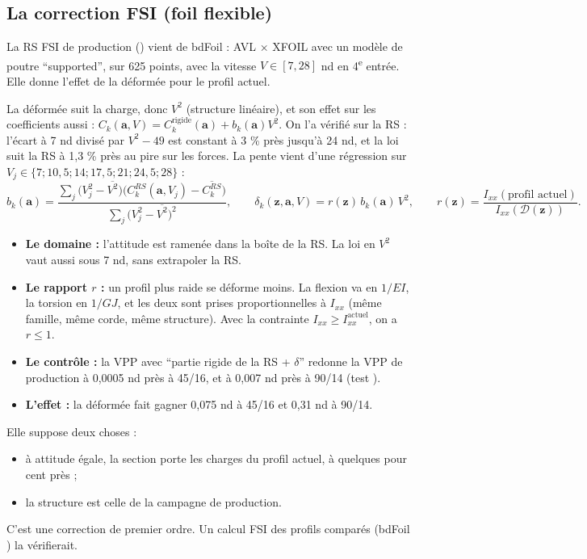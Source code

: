 \documentclass[10pt,a4paper]{article}
\newcommand{\vz}{\bm{z}}
\newcommand{\va}{\bm{a}}
\begin{document}
\subsection{La correction FSI (foil flexible)}
\label{sec:fsi}
La RS FSI de production () vient de bdFoil
 : AVL × XFOIL avec un modèle de poutre \enquote{supported}, sur 625 points, avec la
vitesse $V\in[7,28]$ nd en 4\textsuperscript{e} entrée. Elle donne l'effet de la déformée pour le profil
actuel.

La déformée suit la charge, donc $V^2$ (structure linéaire), et son effet sur les coefficients aussi :
$C_k(\va,V)=C_k^{\text{rigide}}(\va)+b_k(\va)V^2$. On l'a vérifié sur la RS : l'écart à 7 nd divisé par
$V^2-49$ est constant à 3 \% près jusqu'à 24 nd, et la loi suit la RS à 1,3 \% près au pire sur les forces.
La pente vient d'une régression sur $V_j\in\{7;10{,}5;14;17{,}5;21;24{,}5;28\}$ :
\[
  b_k(\va) = \frac{\sum_j \big(V_j^2-\overline{V^2}\big)\big(C_k^{RS}(\va,V_j)-\overline{C_k^{RS}}\big)}
                  {\sum_j \big(V_j^2-\overline{V^2}\big)^2},
  \qquad
  \delta_k(\vz,\va,V) = r(\vz)\, b_k(\va)\, V^2,\qquad
  r(\vz)=\frac{I_{xx}(\text{profil actuel})}{I_{xx}(\mathcal{D}(\vz))}.
\]
\begin{itemize}
  \item \textbf{Le domaine :} l'attitude est ramenée dans la boîte de la RS. La loi en $V^2$ vaut aussi
        sous 7 nd, sans extrapoler la RS.
  \item \textbf{Le rapport $r$ :} un profil plus raide se déforme moins. La flexion va en $1/EI$, la torsion
        en $1/GJ$, et les deux sont prises proportionnelles à $I_{xx}$ (même famille, même corde, même
        structure). Avec la contrainte $I_{xx}\ge I_{xx}^{\text{actuel}}$, on a $r\le 1$.
  \item \textbf{Le contrôle :} la VPP avec \enquote{partie rigide de la RS + $\delta$} redonne la VPP de
        production à 0,0005 nd près à 45/16, et à 0,007 nd près à 90/14 (test ).
  \item \textbf{L'effet :} la déformée fait gagner 0,075 nd à 45/16 et 0,31 nd à 90/14.
\end{itemize}

\begin{subtilite}
Elle suppose deux choses :
\begin{itemize}
  \item à attitude égale, la section porte les charges du profil actuel, à quelques pour cent près ;
  \item la structure est celle de la campagne de production.
\end{itemize}
C'est une correction de premier ordre. Un calcul FSI des profils comparés (bdFoil ) la
vérifierait.
\end{subtilite}
\end{document}
